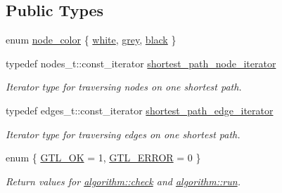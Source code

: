 \subsection*{Public Types}
\begin{DoxyCompactItemize}
\item 
enum \mbox{\hyperlink{classbid__dijkstra_a8b7dcccc9fab2ec5edc8da01029c09d5}{node\+\_\+color}} \{ \mbox{\hyperlink{classbid__dijkstra_a8b7dcccc9fab2ec5edc8da01029c09d5abbd36b03487d4100360b3d6e94309b7b}{white}}, 
\mbox{\hyperlink{classbid__dijkstra_a8b7dcccc9fab2ec5edc8da01029c09d5a5e3971e0090719b93ed71811edcd7360}{grey}}, 
\mbox{\hyperlink{classbid__dijkstra_a8b7dcccc9fab2ec5edc8da01029c09d5acc2693da1b850fc6c7e79aef42fae336}{black}}
 \}
\item 
typedef nodes\+\_\+t\+::const\+\_\+iterator \mbox{\hyperlink{classbid__dijkstra_a47d15051149b03179778a1553635b9d3}{shortest\+\_\+path\+\_\+node\+\_\+iterator}}
\begin{DoxyCompactList}\small\item\em Iterator type for traversing nodes on one shortest path. \end{DoxyCompactList}\item 
typedef edges\+\_\+t\+::const\+\_\+iterator \mbox{\hyperlink{classbid__dijkstra_a12c551a4f2fea9d38d2b6488278e3a09}{shortest\+\_\+path\+\_\+edge\+\_\+iterator}}
\begin{DoxyCompactList}\small\item\em Iterator type for traversing edges on one shortest path. \end{DoxyCompactList}\item 
enum \{ \mbox{\hyperlink{classalgorithm_af1a0078e153aa99c24f9bdf0d97f6710a5114c20e4a96a76b5de9f28bf15e282b}{G\+T\+L\+\_\+\+OK}} = 1, 
\mbox{\hyperlink{classalgorithm_af1a0078e153aa99c24f9bdf0d97f6710a6fcf574690bbd6cf710837a169510dd7}{G\+T\+L\+\_\+\+E\+R\+R\+OR}} = 0
 \}
\begin{DoxyCompactList}\small\item\em Return values for \mbox{\hyperlink{classalgorithm_a76361fb03ad1cf643affc51821e43bed}{algorithm\+::check}} and \mbox{\hyperlink{classalgorithm_a734b189509a8d6b56b65f8ff772d43ca}{algorithm\+::run}}. \end{DoxyCompactList}\end{DoxyCompactItemize}
